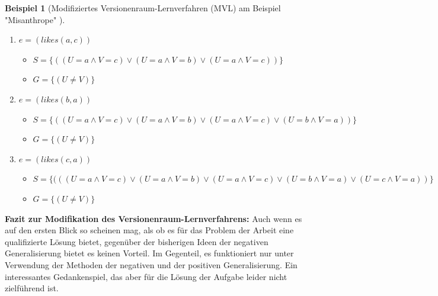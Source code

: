 \documentclass[a4paper, 11pt]{book}
\newtheorem{Bsp}{Beispiel}[section]
\begin{document}
{\begin{Bsp}[Modifiziertes Versionenraum-Lernverfahren (MVL) am Beispiel "{}Misanthrope"{} ]
\begin{itemize}
\begin{enumerate}
		\begin{itemize}
			\item $ S = \{(U = a \land V = c) \lor (U = a \land V = b)\}$ 
			\item $ G = \{(U \neq V)\} $
		\end{itemize}
		\item $ e = (likes(a,c)) $
		\begin{itemize}
			\item $ S = \{((U = a \land V = c) \lor (U = a \land V = b) \lor (U = a \land V = c))\}$ 
			\item $ G = \{(U \neq V)\} $
		\end{itemize}	
		\item $ e = (likes(b,a)) $
		\begin{itemize}
			\item $ S = \{((U = a \land V = c) \lor (U = a \land V = b) \lor (U = a \land V = c) \lor (U = b \land V = a))\}$ 
			\item $ G = \{(U \neq V)\} $
		\end{itemize}
		\item $ e = (likes(c,a)) $
		\begin{itemize}
			\item $ S = \{(((U = a \land V = c) \lor (U = a \land V = b) \lor (U = a \land V = c) \lor (U = b \land V = a) \lor (U = c \land V = a))\}$ 
			\item $ G = \{(U \neq V)\} $
		\end{itemize}	
	\end{enumerate}
\end{itemize}
\end{Bsp}
\textbf{{\large Fazit zur Modifikation des Versionenraum-Lernverfahrens:}} \label{Fazit VRL} 
Auch wenn es auf den ersten Blick so scheinen mag, als ob es für das Problem der Arbeit eine qualifizierte Lösung bietet, gegenüber der bisherigen Ideen der negativen Generalisierung bietet es keinen Vorteil. Im Gegenteil, es funktioniert nur unter Verwendung der Methoden der negativen und der positiven Generalisierung. Ein interessantes Gedankenspiel, das aber für die Lösung der Aufgabe leider nicht zielführend ist. 
}
\end{document}
